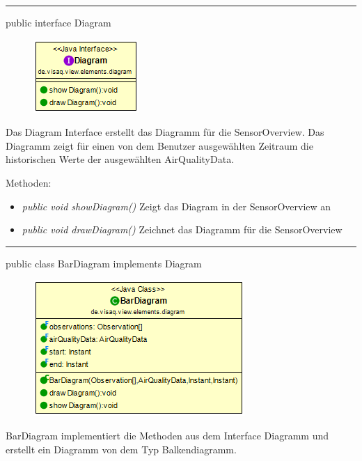 \clearpage %

\rule{\textwidth}{0.4pt}
public interface Diagram

\begin{minipage}{0.3\textwidth}
    \begin{figure}[H]
        \includegraphics[scale = 0.7]{media/frontend/view/de.view.elements.diagram/Diagram_Class.png}
    \end{figure}
\end{minipage} \hfill
\begin{minipage}{0.6\textwidth}
Das Diagram Interface erstellt das Diagramm für die SensorOverview. Das Diagramm zeigt für einen von dem Benutzer ausgewählten Zeitraum die historischen Werte der ausgewählten AirQualityData.
\end{minipage}

Methoden:
\begin{itemize}
    \item \emph{public void showDiagram()} Zeigt das Diagram in der SensorOverview an
    \item \emph{public void drawDiagram()} Zeichnet das Diagramm für die SensorOverview
\end{itemize}

\rule{\textwidth}{0.4pt}
public class BarDiagram implements Diagram

\begin{minipage}{0.3\textwidth}
    \begin{figure}[H]
        \includegraphics[scale = 0.5]{media/frontend/view/de.view.elements.diagram/BarDiagram_Class.png}
    \end{figure}
    \end{minipage} \hfill
    \begin{minipage}{0.6\textwidth}
BarDiagram implementiert die Methoden aus dem Interface Diagramm und erstellt ein Diagramm von dem Typ Balkendiagramm.
\end{minipage}

